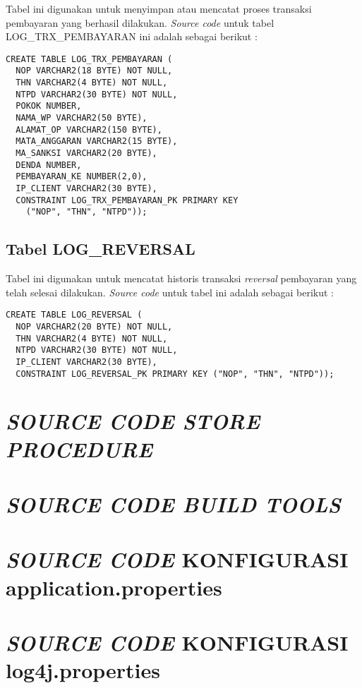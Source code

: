 \documentclass[pdftex,12pt, oneside]{article}
\begin{document}
  Tabel ini digunakan untuk menyimpan atau mencatat proses transaksi pembayaran yang berhasil dilakukan. \textit{Source code} untuk tabel LOG\_TRX\_PEMBAYARAN ini adalah sebagai berikut :
  
  \begin{lstlisting}    
CREATE TABLE LOG_TRX_PEMBAYARAN (	
  NOP VARCHAR2(18 BYTE) NOT NULL,
  THN VARCHAR2(4 BYTE) NOT NULL,
  NTPD VARCHAR2(30 BYTE) NOT NULL,
  POKOK NUMBER,
  NAMA_WP VARCHAR2(50 BYTE),
  ALAMAT_OP VARCHAR2(150 BYTE),
  MATA_ANGGARAN VARCHAR2(15 BYTE),
  MA_SANKSI VARCHAR2(20 BYTE),
  DENDA NUMBER,
  PEMBAYARAN_KE NUMBER(2,0),
  IP_CLIENT VARCHAR2(30 BYTE),
  CONSTRAINT LOG_TRX_PEMBAYARAN_PK PRIMARY KEY 
    ("NOP", "THN", "NTPD"));  
  \end{lstlisting}
  
  \subsection{Tabel LOG\_REVERSAL}
  
  Tabel ini digunakan untuk mencatat historis transaksi \textit{reversal} pembayaran yang telah selesai dilakukan. \textit{Source code} untuk tabel ini adalah sebagai berikut :
  
  \begin{lstlisting}
CREATE TABLE LOG_REVERSAL (	
  NOP VARCHAR2(20 BYTE) NOT NULL,
  THN VARCHAR2(4 BYTE) NOT NULL,
  NTPD VARCHAR2(30 BYTE) NOT NULL,
  IP_CLIENT VARCHAR2(30 BYTE),
  CONSTRAINT LOG_REVERSAL_PK PRIMARY KEY ("NOP", "THN", "NTPD"));    
  \end{lstlisting}


\section{\textit{SOURCE CODE STORE PROCEDURE}}


\section{\textit{SOURCE CODE BUILD TOOLS}}


\section{\textit{SOURCE CODE} KONFIGURASI application.properties}


\section{\textit{SOURCE CODE} KONFIGURASI log4j.properties}
\end{document}
